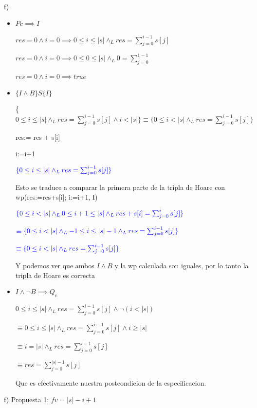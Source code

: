 \documentclass[a4paper,10pt]{article}
\begin{document}
f) \begin{itemize}
    \item $Pc\implies I$

          $res=0 \land i=0 \implies 0\leq i \leq |s| \land_L res=\sum_{j=0}^{i-1}s[j]$

          $res=0 \land i=0 \implies 0\leq 0 \leq |s| \land_L 0=\sum_{j=0}^{1-1}$

          $res=0 \land i=0 \implies true$

    \item $\{I\land B\}S\{I\}$

          {\color{blue}\{$0\leq i \leq |s| \land_L res=\sum_{j=0}^{i-1}s[j] \land i<|s|\}\equiv \{0\leq i < |s| \land_L res=\sum_{j=0}^{i-1}s[j]\}$}

          res:= res + s[i]

          i:=i+1

          ${\color{blue}\{0\leq i \leq |s| \land_L res=\sum_{j=0}^{i-1}s[j]\}}$

          Esto se traduce a comparar la primera parte de la tripla de Hoare con wp(res:=res+s[i]; i:=i+1, I)

          ${\color{blue}\{0\leq i<|s| \land_L 0\leq i+1 \leq |s| \land_L res+s[i]=\sum_{j=0}^{i}s[j]\}}$

          ${\color{blue}\equiv\{ 0\leq i<|s| \land_L -1\leq i \leq |s|-1 \land_L res=\sum_{j=0}^{i-1}s[j]\}}$

          ${\color{blue}\equiv\{ 0\leq i < |s| \land_L res=\sum_{j=0}^{i-1}s[j]\}}$

          Y podemos ver que ambos $I\land B$ y la wp calculada son iguales, por lo tanto la tripla de Hoare es correcta

    \item $I \land \lnot B \implies Q_c$

          $0\leq i \leq |s| \land_L res=\sum_{j=0}^{i-1}s[j] \land \lnot (i<|s|)$

          $\equiv 0\leq i \leq |s| \land_L res=\sum_{j=0}^{i-1}s[j] \land i\geq|s|$

          $\equiv i = |s| \land_L res=\sum_{j=0}^{i-1}s[j]$

          $\equiv res=\sum_{j=0}^{|s|-1}s[j]$

          Que es efectivamente nuestra postcondicion de la especificacion.
\end{itemize}
\pagebreak

f)  Propuesta 1: $fv=|s|-i+1$

\salto{\baselineskip}
\end{document}
